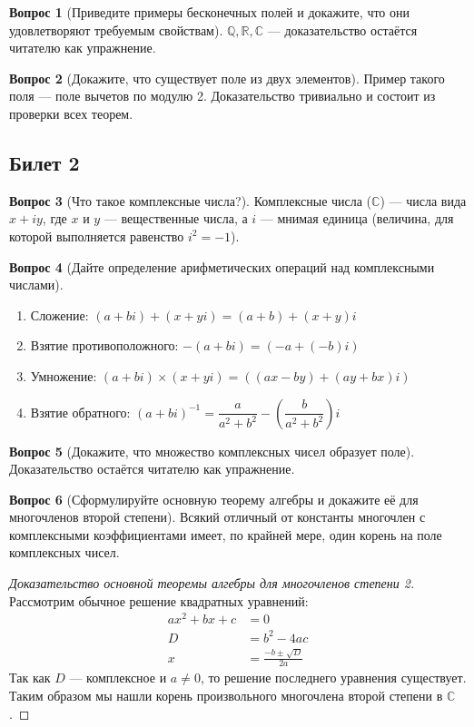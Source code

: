 \documentclass[a4paper,11pt]{article}
\theoremstyle{remark}
\theoremstyle{definition}
\newtheorem{question}{Вопрос}
\numberwithin{question}{subsection}
\begin{document}
\begin{question}[Приведите примеры бесконечных полей и докажите, что они удовлетворяют требуемым свойствам]
\(\mathbb{Q, R, C}\) --- доказательство остаётся читателю как упражнение.
\end{question}

\begin{question}[Докажите, что существует поле из двух элементов]
Пример такого поля --- поле вычетов по модулю 2. Доказательство тривиально и состоит из проверки всех теорем. 
\end{question}


\subsection{Билет 2} 
\begin{question}[Что такое комплексные числа?]
Комплексные числа (\(\mathbb{C}\)) --- числа вида \(x + iy\), где \(x\) и \(y\) --- вещественные числа, а \(i\) --- мнимая единица (величина, для которой выполняется равенство \(i^2 = -1\)).
\end{question}
	
\begin{question}[Дайте определение арифметических операций над комплексными числами]\(\)
\begin{enumerate}
	\item Сложение: \((a + bi) + (x + yi) = (a+b) + (x+y)i\)
	\item Взятие противоположного: \(-(a + bi) = (-a + (-b)i)\)
	\item Умножение: \((a + bi) \times (x + yi) = ((ax - by) + (ay + bx)i)\)
	\item Взятие обратного: \((a + bi)^{-1} = \dfrac{a}{a^2 + b^2} - \left(\dfrac{b}{a^2 + b^2}\right)i\)
\end{enumerate}
\end{question}

\begin{question}[Докажите, что множество комплексных чисел образует поле]
Доказательство остаётся читателю как упражнение.
\end{question}

\begin{question}[Сформулируйте основную теорему алгебры и докажите её для многочленов второй степени]
Всякий отличный от константы многочлен с комплексными коэффициентами имеет, по крайней мере, один корень на поле комплексных чисел.
\begin{proof}[Доказательство основной теоремы алгебры для многочленов степени 2]
Рассмотрим обычное решение квадратных уравнений:
\begin{align*}
	ax^2 + bx + c &= 0 \\
	D &= b^2 - 4ac \\
	x &= \frac{-b \pm \sqrt{D}}{2a}
\end{align*}
Так как \(D\) --- комплексное и \(a \neq 0\), то решение последнего уравнения существует. Таким образом мы нашли корень произвольного многочлена второй степени в \(\mathbb{C}\).
\end{proof}
\end{question}
\end{document}
